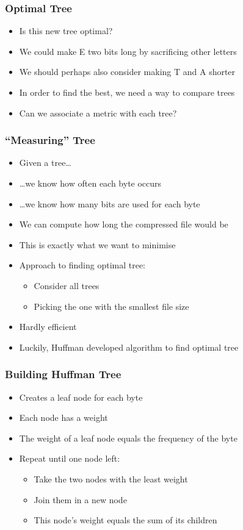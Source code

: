 \begin{frame}
  \frametitle{Optimal Tree}
  \begin{itemize}
    \item Is this new tree optimal?
    \item We could make E two bits long by sacrificing other letters
    \item We should perhaps also consider making T and A shorter
    \item In order to find the best, we need a way to compare trees
    \item Can we associate a metric with each tree?
  \end{itemize}
\end{frame}

\begin{frame}
  \frametitle{``Measuring'' Tree}
  \begin{itemize}
    \item Given a tree\dots
    \item \dots we know how often each byte occurs
    \item \dots we know how many bits are used for each byte
    \item We can compute how long the compressed file would be
    \item This is exactly what we want to minimise
    \item Approach to finding optimal tree:
          \begin{itemize}
            \item Consider all trees
            \item Picking the one with the smallest file size
          \end{itemize}
    \item Hardly efficient
    \item Luckily, Huffman developed algorithm to find optimal tree
  \end{itemize}
\end{frame}

\begin{frame}
  \frametitle{Building Huffman Tree}
  \begin{itemize}
    \item Creates a leaf node for each byte
    \item Each node has a weight
    \item The weight of a leaf node equals the frequency of the byte
    \item Repeat until one node left:
          \begin{itemize}
            \item Take the two nodes with the least weight
            \item Join them in a new node
            \item This node's weight equals the sum of its children
          \end{itemize}
  \end{itemize}
\end{frame}

